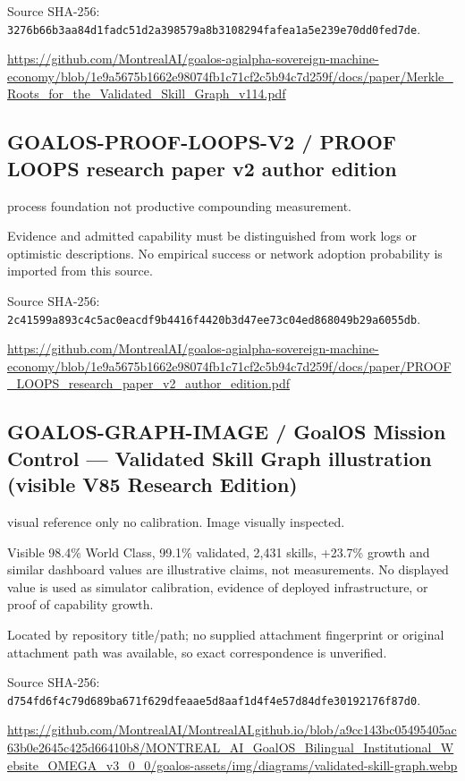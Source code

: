 \documentclass[10pt]{article}
\begin{document}
Source SHA-256: \nolinkurl{3276b66b3aa84d1fadc51d2a398579a8b3108294fafea1a5e239e70dd0fed7de}.

\url{https://github.com/MontrealAI/goalos-agialpha-sovereign-machine-economy/blob/1e9a5675b1662e98074fb1c71cf2c5b94c7d259f/docs/paper/Merkle_Roots_for_the_Validated_Skill_Graph_v114.pdf}

\subsection*{GOALOS-PROOF-LOOPS-V2 / PROOF LOOPS research paper v2 author edition}

process foundation not productive compounding measurement. 

Evidence and admitted capability must be distinguished from work logs or optimistic descriptions. No empirical success or network adoption probability is imported from this source.

Source SHA-256: \nolinkurl{2c41599a893c4c5ac0eacdf9b4416f4420b3d47ee73c04ed868049b29a6055db}.

\url{https://github.com/MontrealAI/goalos-agialpha-sovereign-machine-economy/blob/1e9a5675b1662e98074fb1c71cf2c5b94c7d259f/docs/paper/PROOF_LOOPS_research_paper_v2_author_edition.pdf}

\subsection*{GOALOS-GRAPH-IMAGE / GoalOS Mission Control --- Validated Skill Graph illustration (visible V85 Research Edition)}

visual reference only no calibration. Image visually inspected.

Visible 98.4\% World Class, 99.1\% validated, 2,431 skills, +23.7\% growth and similar dashboard values are illustrative claims, not measurements. No displayed value is used as simulator calibration, evidence of deployed infrastructure, or proof of capability growth.

Located by repository title/path; no supplied attachment fingerprint or original attachment path was available, so exact correspondence is unverified.

Source SHA-256: \nolinkurl{d754fd6f4c79d689ba671f629dfeaae5d8aaf1d4f4e57d84dfe30192176f87d0}.

\url{https://github.com/MontrealAI/MontrealAI.github.io/blob/a9cc143bc05495405ac63b0e2645c425d66410b8/MONTREAL_AI_GoalOS_Bilingual_Institutional_Website_OMEGA_v3_0_0/goalos-assets/img/diagrams/validated-skill-graph.webp}
\end{document}
